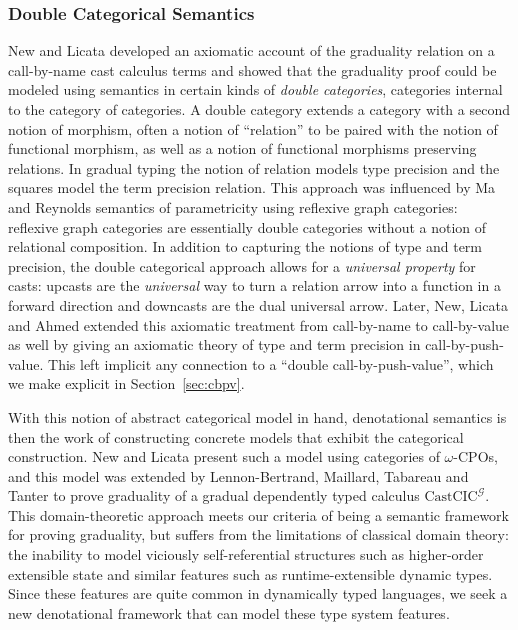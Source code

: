

\subsubsection{Double Categorical Semantics}

New and Licata \cite{new-licata18} developed an axiomatic account of
the graduality relation on a call-by-name cast calculus terms and
showed that the graduality proof could be modeled using semantics in
certain kinds of \emph{double categories}, categories internal to the
category of categories. A double category extends a category with a
second notion of morphism, often a notion of ``relation'' to be paired
with the notion of functional morphism, as well as a notion of
functional morphisms preserving relations. In gradual typing the
notion of relation models type precision and the squares model the
term precision relation. This approach was influenced by Ma and
Reynolds semantics of parametricity using reflexive graph categories:
reflexive graph categories are essentially double categories without a
notion of relational composition. In addition to capturing the notions
of type and term precision, the double categorical approach allows for
a \emph{universal property} for casts: upcasts are the
\emph{universal} way to turn a relation arrow into a function in a
forward direction and downcasts are the dual universal arrow.  Later,
New, Licata and Ahmed \cite{new-licata-ahmed19} extended this
axiomatic treatment from call-by-name to call-by-value as well by
giving an axiomatic theory of type and term precision in
call-by-push-value. This left implicit any connection to a ``double
call-by-push-value'', which we make explicit in
Section~\ref{sec:cbpv}.

With this notion of abstract categorical model in hand, denotational
semantics is then the work of constructing concrete models that
exhibit the categorical construction. New and Licata
\cite{new-licata18} present such a model using categories of
$\omega$-CPOs, and this model was extended by Lennon-Bertrand,
Maillard, Tabareau and Tanter to prove graduality of a gradual
dependently typed calculus $\textrm{CastCIC}^{\mathcal G}$. This
domain-theoretic approach meets our criteria of being a semantic
framework for proving graduality, but suffers from the limitations of
classical domain theory: the inability to model viciously
self-referential structures such as higher-order extensible state and
similar features such as runtime-extensible dynamic types. Since these
features are quite common in dynamically typed languages, we seek a
new denotational framework that can model these type system features.

